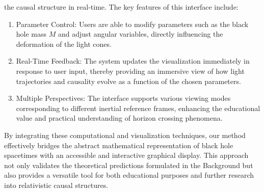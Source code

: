 \documentclass{article}
\begin{document}
the causal structure in real-time. The key features of this interface include: \begin{enumerate}   \item Parameter Control: Users are able to modify parameters such as the black hole mass $M$ and adjust angular variables, directly influencing the deformation of the light cones.   \item Real-Time Feedback: The system updates the visualization immediately in response to user input, thereby providing an immersive view of how light trajectories and causality evolve as a function of the chosen parameters.   \item Multiple Perspectives: The interface supports various viewing modes corresponding to different inertial reference frames, enhancing the educational value and practical understanding of horizon crossing phenomena. \end{enumerate}  By integrating these computational and visualization techniques, our method effectively bridges the abstract mathematical representation of black hole spacetimes with an accessible and interactive graphical display. This approach not only validates the theoretical predictions formulated in the Background but also provides a versatile tool for both educational purposes and further research into relativistic causal structures.
\end{document}
